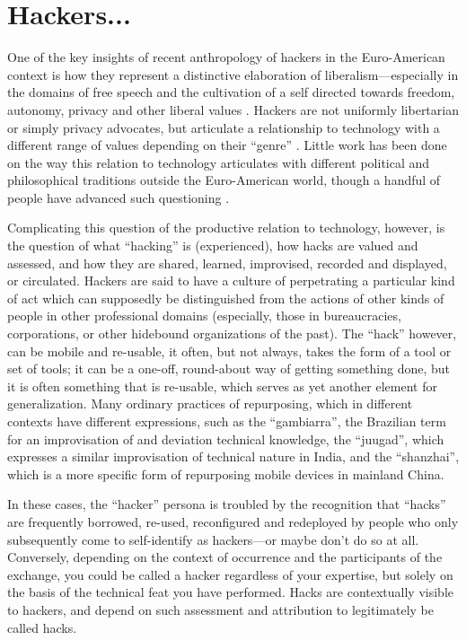 \documentclass[10pt,letter,oneside]{scrartcl}
\begin{document}
\section*{Hackers...}

One of the key insights of recent anthropology of hackers in the Euro-American 
context is how they represent a distinctive elaboration of liberalism---especially 
in the domains of free speech and the cultivation of a self directed towards freedom, autonomy, privacy and other liberal values \parencite{coleman_coding_2012,kelty_two_2008,coleman_hacker_2014}. Hackers are
not uniformly libertarian or simply privacy advocates, but articulate a
relationship to technology with a different range of values depending on their
``genre'' \parencite{coleman_hacker_2008}. Little work has been done on the way 
this relation to technology articulates with different political and 
philosophical traditions outside the Euro-American world, though a handful 
of people have advanced such questioning \cite{xiang_2007,takhteyev_coding_2012,chan_networking_2013}.

Complicating this question of the productive relation to technology, however, 
is the question of what ``hacking'' is (experienced), how hacks are valued and 
assessed, and how they are shared, learned, improvised, recorded and displayed, or circulated.  Hackers are said to have a culture of perpetrating a particular 
kind of act which can supposedly be distinguished from the actions of other kinds 
of people in other professional domains (especially, those in bureaucracies, 
corporations, or other hidebound organizations of the past).  The ``hack''
however, can be mobile and re-usable, it often, but not always, takes the form
of a tool or set of tools; it can be a one-off, round-about way of getting
something done, but it is often something that is re-usable, which serves as yet
another element for generalization.  Many ordinary practices of repurposing,
which in different contexts have different expressions, such as the
``gambiarra'', the Brazilian term for an improvisation of and deviation
technical knowledge, the ``juugad'', which expresses a similar improvisation 
of technical nature in India, and the ``shanzhai'', which is a more specific form of repurposing mobile devices in mainland China.


In these cases, the ``hacker'' persona is troubled by the recognition that
``hacks'' are frequently borrowed, re-used, reconfigured and redeployed by
people who only subsequently come to self-identify as hackers---or maybe
don’t do so at all.  Conversely, depending on the context of occurrence and the
participants of the exchange, you could be called a hacker regardless of your
expertise, but solely on the basis of the technical feat you have performed.
Hacks are contextually visible to hackers, and depend on such assessment and
attribution to legitimately be called hacks.
\end{document}
